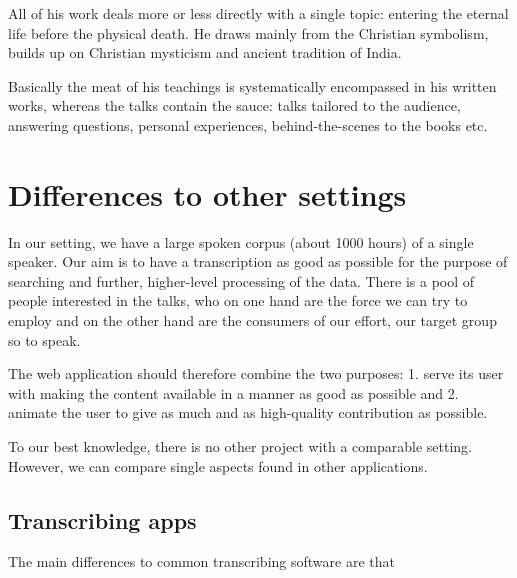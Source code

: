 \documentclass{llncs}
\begin{document}
All of his work deals more or less directly with a single topic: entering the
eternal life before the physical death. He draws mainly from the Christian
symbolism, builds up on Christian mysticism and ancient tradition of India.

Basically the meat of his teachings is systematically encompassed in his written
works, whereas the talks contain the sauce: talks tailored to the audience,
answering questions, personal experiences, behind-the-scenes to the books etc.

\section{Differences to other settings}

In our setting, we have a large spoken corpus (about 1000 hours) of a single
speaker. Our aim is to have a transcription as good as possible for the purpose
of searching and further, higher-level processing of the data. There is a pool
of people interested in the talks, who on one hand are the force we can try to
employ and on the other hand are the consumers of our effort, our target group
so to speak.

The web application should therefore combine the two purposes: 1. serve its user
with making the content available in a manner as good as possible and 2. animate
the user to give as much and as high-quality contribution as possible.

To our best knowledge, there is no other project with a comparable setting.
However, we can compare single aspects found in other applications.

\subsection{Transcribing apps}

The main differences to common transcribing software are that
\end{document}
